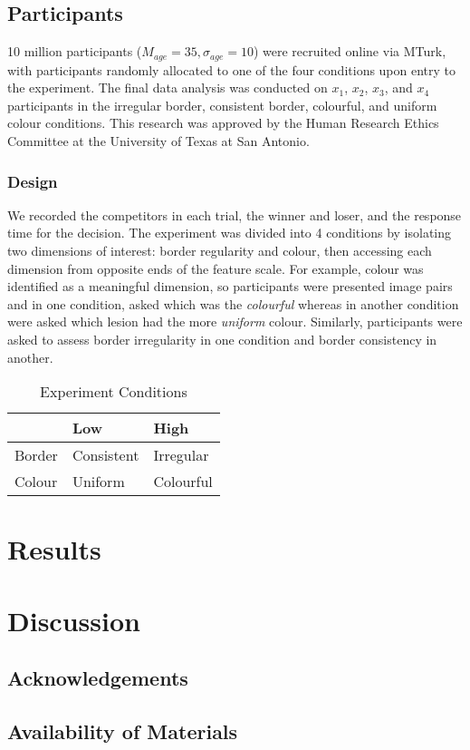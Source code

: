 \documentclass[a4paper, natbib, doc, 12pt]{apa7}
\begin{document}
\subsection{Participants}
10 million participants ($M_{age} = 35,\sigma_{age} = 10$) were recruited online via MTurk, with participants randomly allocated to one of the four conditions upon entry to the experiment. The final data analysis was conducted on $x_{1}$, $x_{2}$, $x_{3}$, and $x_{4}$ participants in the irregular border, consistent border, colourful, and uniform colour conditions. This research was approved by the Human Research Ethics Committee at the University of Texas at San Antonio.

\subsubsection{Design}
We recorded the competitors in each trial, the winner and loser, and the response time for the decision. The experiment was divided into 4 conditions by isolating two dimensions of interest: border regularity and colour, then accessing each dimension from opposite ends of the feature scale. For example, colour was identified as a meaningful dimension, so participants were presented image pairs and in one condition, asked which was the \textit{colourful} whereas in another condition were asked which lesion had the more \textit{uniform} colour. Similarly, participants were asked to assess border irregularity in one condition and border consistency in another.
\begin{table}[!htp]
\centering
\caption{Experiment Conditions}
\begin{tabular}{lll}
 & Low & High \\ \hline
\multicolumn{1}{l|}{Border} & Consistent & Irregular \\
\multicolumn{1}{l|}{Colour} & Uniform & Colourful
\end{tabular}
\end{table}

\section{Results}
\section{Discussion}

\subsection*{Acknowledgements}
\subsection*{Availability of Materials}
\newpage

\end{document}
